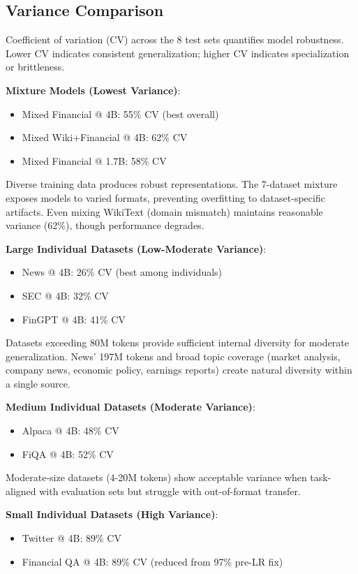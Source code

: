 \subsection{Variance Comparison}

Coefficient of variation (CV) across the 8 test sets quantifies model robustness. Lower CV indicates consistent generalization; higher CV indicates specialization or brittleness.

\textbf{Mixture Models (Lowest Variance)}:
\begin{itemize}
\item Mixed Financial @ 4B: 55\% CV (best overall)
\item Mixed Wiki+Financial @ 4B: 62\% CV
\item Mixed Financial @ 1.7B: 58\% CV
\end{itemize}

Diverse training data produces robust representations. The 7-dataset mixture exposes models to varied formats, preventing overfitting to dataset-specific artifacts. Even mixing WikiText (domain mismatch) maintains reasonable variance (62\%), though performance degrades.

\textbf{Large Individual Datasets (Low-Moderate Variance)}:
\begin{itemize}
\item News @ 4B: 26\% CV (best among individuals)
\item SEC @ 4B: 32\% CV
\item FinGPT @ 4B: 41\% CV
\end{itemize}

Datasets exceeding 80M tokens provide sufficient internal diversity for moderate generalization. News' 197M tokens and broad topic coverage (market analysis, company news, economic policy, earnings reports) create natural diversity within a single source.

\textbf{Medium Individual Datasets (Moderate Variance)}:
\begin{itemize}
\item Alpaca @ 4B: 48\% CV
\item FiQA @ 4B: 52\% CV
\end{itemize}

Moderate-size datasets (4-20M tokens) show acceptable variance when task-aligned with evaluation sets but struggle with out-of-format transfer.

\textbf{Small Individual Datasets (High Variance)}:
\begin{itemize}
\item Twitter @ 4B: 89\% CV
\item Financial QA @ 4B: 89\% CV (reduced from 97\% pre-LR fix)
\end{itemize}


